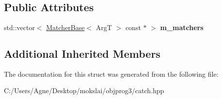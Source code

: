 \subsection*{Public Attributes}
\begin{DoxyCompactItemize}
\item 
\mbox{\label{struct_catch_1_1_matchers_1_1_impl_1_1_match_all_of_a98d6a2611f195a4a5c49f92fd877be9a}} 
std\+::vector$<$ \mbox{\hyperlink{struct_catch_1_1_matchers_1_1_impl_1_1_matcher_base}{Matcher\+Base}}$<$ ArgT $>$ const  $\ast$ $>$ {\bfseries m\+\_\+matchers}
\end{DoxyCompactItemize}
\subsection*{Additional Inherited Members}


The documentation for this struct was generated from the following file\+:\begin{DoxyCompactItemize}
\item 
C\+:/\+Users/\+Agne/\+Desktop/mokslai/objprog3/catch.\+hpp\end{DoxyCompactItemize}
